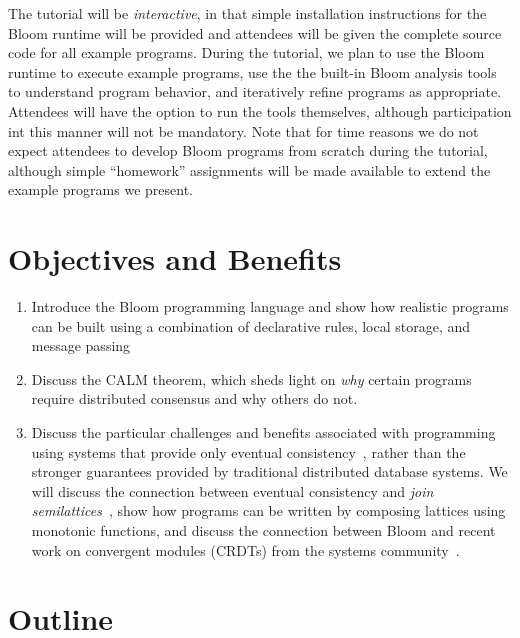 \documentclass{sig-alternate}
\begin{document}
The tutorial will be \emph{interactive}, in that simple installation
instructions for the Bloom runtime will be provided and attendees will be given
the complete source code for all example programs. During the tutorial, we plan
to use the Bloom runtime to execute example programs, use the the built-in Bloom
analysis tools to understand program behavior, and iteratively refine programs
as appropriate. Attendees will have the option to run the tools themselves,
although participation int this manner will not be mandatory. Note that for time
reasons we do not expect attendees to develop Bloom programs from scratch during
the tutorial, although simple ``homework'' assignments will be made available to
extend the example programs we present.

\section{Objectives and Benefits}

\begin{enumerate}
\item
  Introduce the Bloom programming language and show how realistic programs can
  be built using a combination of declarative rules, local storage, and message
  passing
\item
  Discuss the CALM theorem, which sheds light on \emph{why} certain programs
  require distributed consensus and why others do not.
\item
  Discuss the particular challenges and benefits associated with programming
  using systems that provide only eventual
  consistency~\cite{DeCandia2007,Terry1995,vogels}, rather than the stronger
  guarantees provided by traditional distributed database systems. We will
  discuss the connection between eventual consistency and \emph{join
    semilattices}~\cite{Conway2012}, show how programs can be written by
  composing lattices using monotonic functions, and discuss the connection
  between Bloom and recent work on convergent modules (CRDTs) from the systems
  community~\cite{Shapiro2011a,Shapiro2011b}.
\end{enumerate}

\section{Outline}
\end{document}
